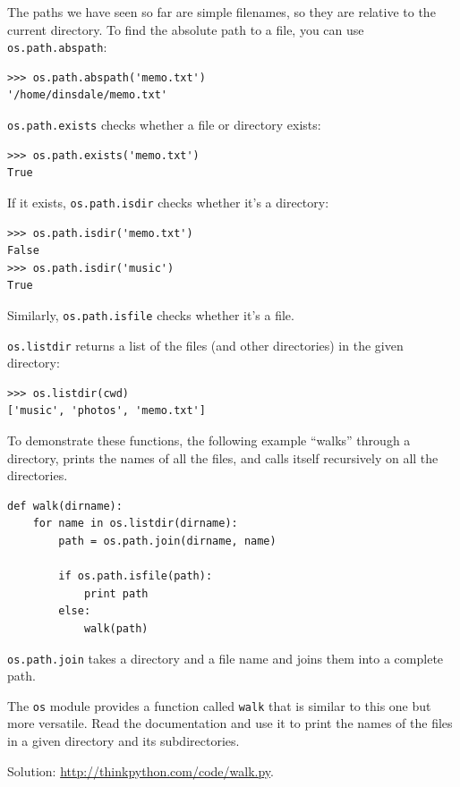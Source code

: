 \documentclass[10pt]{book}
\begin{document}
\begin{CJK}{UTF8}{gbsn}
The paths we have seen so far are simple filenames, so they are
relative to the current directory.  To find the absolute path to
a file, you can use {\tt os.path.abspath}:

\begin{verbatim}
>>> os.path.abspath('memo.txt')
'/home/dinsdale/memo.txt'
\end{verbatim}
%
{\tt os.path.exists} checks
whether a file or directory exists:

\begin{verbatim}
>>> os.path.exists('memo.txt')
True
\end{verbatim}
%
If it exists, {\tt os.path.isdir} checks whether it's a directory:

\begin{verbatim}
>>> os.path.isdir('memo.txt')
False
>>> os.path.isdir('music')
True
\end{verbatim}
%
Similarly, {\tt os.path.isfile} checks whether it's a file.

{\tt os.listdir} returns a list of the files (and other directories)
in the given directory:

\begin{verbatim}
>>> os.listdir(cwd)
['music', 'photos', 'memo.txt']
\end{verbatim}
%
To demonstrate these functions, the following example
``walks'' through a directory, prints
the names of all the files, and calls itself recursively on
all the directories.

\begin{verbatim}
def walk(dirname):
    for name in os.listdir(dirname):
        path = os.path.join(dirname, name)

        if os.path.isfile(path):
            print path
        else:
            walk(path)
\end{verbatim}
%
{\tt os.path.join} takes a directory and a file name and joins
them into a complete path.  

\begin{exercise}

The {\tt os} module provides a function called {\tt walk}
that is similar to this one but more versatile.  Read
the documentation and use it to print the names of the
files in a given directory and its subdirectories.

Solution: \url{http://thinkpython.com/code/walk.py}.

\end{exercise}



\end{CJK}
\end{document}
